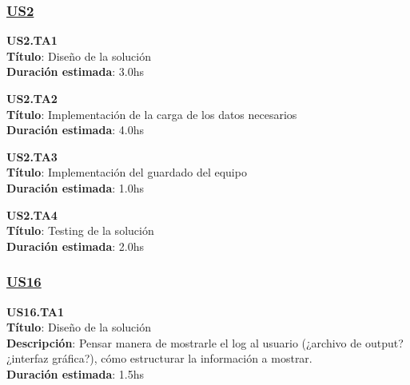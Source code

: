 \subsubsection*{\underline{US2}}

\begin{tcolorbox}
\textbf{US2.TA1} \\
\textbf{Título}: Diseño de la solución \\
\textbf{Duración estimada}: 3.0hs
\end{tcolorbox}
\vspace{10pt}

\begin{tcolorbox}
\textbf{US2.TA2} \\
\textbf{Título}: Implementación de la carga de los datos necesarios	\\
\textbf{Duración estimada}: 4.0hs
\end{tcolorbox}
\vspace{10pt}

\begin{tcolorbox}
\textbf{US2.TA3} \\
\textbf{Título}: Implementación del guardado del equipo \\
\textbf{Duración estimada}: 1.0hs
\end{tcolorbox}
\vspace{10pt}


\begin{tcolorbox}
\textbf{US2.TA4} \\
\textbf{Título}: Testing de la solución \\
\textbf{Duración estimada}: 2.0hs
\end{tcolorbox}
\vspace{10pt}

\subsubsection*{\underline{US16}}

\begin{tcolorbox}
\textbf{US16.TA1} \\
\textbf{Título}:  Diseño de la solución\\
\textbf{Descripción}:  Pensar manera de mostrarle el log al usuario (¿archivo de output? ¿interfaz gráfica?), cómo estructurar la información a mostrar. \\
\textbf{Duración estimada}: 1.5hs
\end{tcolorbox}
\vspace{10pt}

